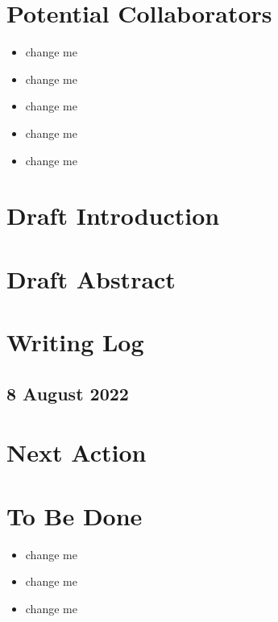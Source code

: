 \documentclass[10pt,letterpaper]{article}
\begin{document}
\section{Potential Collaborators}

\begin{itemize}
\item change me
\item change me
\item change me
\item change me
\item change me
\end{itemize}







\section{Draft Introduction}



\section{Draft Abstract}




\section{Writing Log}

\subsection{8 August 2022}



\section{Next Action}



\section{To Be Done}


\begin{itemize}
\item change me
\item change me
\item change me
\end{itemize}
\end{document}
